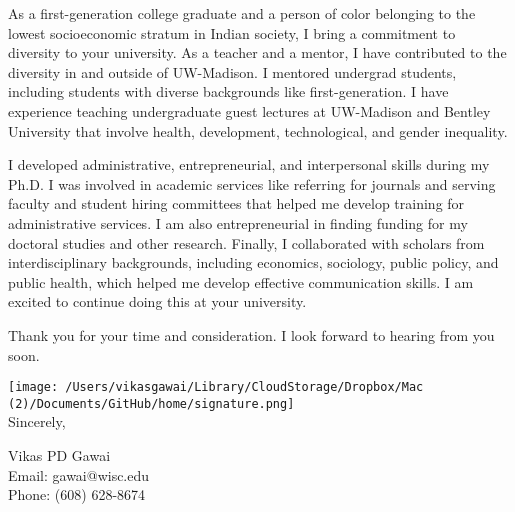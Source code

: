 \documentclass[12pt]{letter}
\begin{document}


As a first-generation college graduate and a person of color belonging to the lowest socioeconomic stratum in Indian society, I bring a commitment to diversity to your university. As a teacher and a mentor, I have contributed to the diversity in and outside of UW-Madison. I mentored undergrad students, including students with diverse backgrounds like first-generation. I have experience teaching undergraduate guest lectures at UW-Madison and Bentley University that involve health, development, technological, and gender inequality. 

I developed administrative, entrepreneurial, and interpersonal skills during my Ph.D. I was involved in academic services like referring for journals and serving faculty and student hiring committees that helped me develop training for administrative services. I am also entrepreneurial in finding funding for my doctoral studies and other research. Finally, I collaborated with scholars from interdisciplinary backgrounds, including economics, sociology, public policy, and public health, which helped me develop effective communication skills. I am excited to continue doing this at your university.

Thank you for your time and consideration. I look forward to hearing from you soon.

\bigskip

\texttt{[image: /Users/vikasgawai/Library/CloudStorage/Dropbox/Mac (2)/Documents/GitHub/home/signature.png]}  \\

\vspace*{-4.8\baselineskip}Sincerely, 

\vspace{1.25\baselineskip}Vikas PD Gawai \\
Email: gawai@wisc.edu \\ Phone: (608) 628-8674
\end{document}
